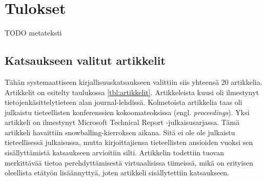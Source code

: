 \documentclass[utf8]{gradu3}
\begin{document}
\chapter{Tulokset}
\label{paaluku-tulokset}

TODO metateksti

\section{Katsaukseen valitut artikkelit}

Tähän systemaattiseen kirjallisuuskatsaukseen valittiin siis yhteensä 20 artikkelia. Artikkelit on esitelty taulukossa \ref{tbl:artikkelit}. Artikkeleista kuusi oli ilmestynyt tietojenkäsittelytieteen alan journal-lehdissä. Kolmetoista artikkelia taas oli julkaistu tieteellisten konferenssien kokoomateoksissa (engl. \textit{proceedings}). Yksi artikkeli \parencite{hemphill-begel-2011} on ilmestynyt Microsoft Technical Report -julkaisusarjassa. Tämä artikkeli havaittiin snowballing-kierroksen aikana. Sitä ei ole ole julkaistu tieteellisessä julkaisussa, mutta kirjoittajiensa tieteellisten ansioiden vuoksi sen sisällyttämistä katsaukseen arvioitiin silti. Artikkelin todettiin tuovan merkittävää tietoa perehdyttämisestä virtuaalisissa tiimeissä, mikä on erityisen oleellista etätyön lisäännyttyä, joten artikkeli sisällytettiin katsaukseen.
\end{document}
